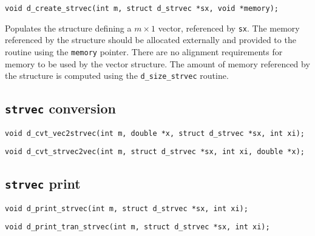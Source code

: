 \documentclass[a4paper]{report}
\begin{document}
\begin{verbatim}
void d_create_strvec(int m, struct d_strvec *sx, void *memory);
\end{verbatim}
Populates the structure defining a $m\times 1$ vector, referenced by {\tt sx}.
The memory referenced by the structure should be allocated externally and provided to the routine using the {\tt memory} pointer.
There are no alignment requirements for memory to be used by the vector structure. %
The amount of memory referenced by the structure is computed using the {\tt d\_size\_strvec} routine.



\subsection{{\tt strvec} conversion}

\begin{verbatim}
void d_cvt_vec2strvec(int m, double *x, struct d_strvec *sx, int xi);
\end{verbatim}

\begin{verbatim}
void d_cvt_strvec2vec(int m, struct d_strvec *sx, int xi, double *x);
\end{verbatim}



\subsection{{\tt strvec} print}

\begin{verbatim}
void d_print_strvec(int m, struct d_strvec *sx, int xi);
\end{verbatim}

\begin{verbatim}
void d_print_tran_strvec(int m, struct d_strvec *sx, int xi);
\end{verbatim}
\end{document}
